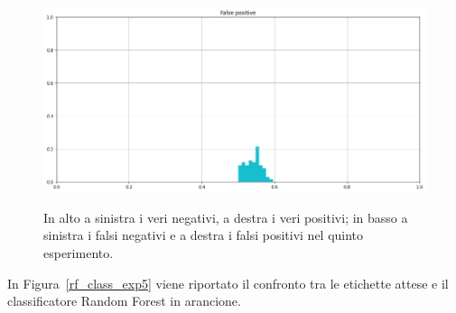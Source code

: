 \documentclass[12pt]{report}
\theoremstyle{definition}
\begin{document}
\begin{figure}
   \begin{minipage}{0.48\textwidth}
     \includegraphics[width=\linewidth]{images/experiment_beta5_sovrapposti/fp.png}\label{fp_b5s}
   \end{minipage}
   \caption{In alto a sinistra i veri negativi, a destra i veri positivi; in basso a sinistra i falsi negativi e a destra i falsi positivi nel quinto esperimento.}
   \label{4cases_exp5}
\end{figure}
In Figura~\ref{rf_class_exp5} viene riportato il confronto tra le etichette attese e il classificatore Random Forest in arancione.
\end{document}
